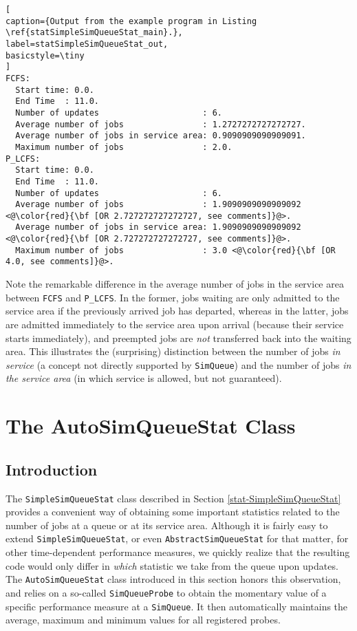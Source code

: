 \documentclass[12pt]{book}
\begin{document}
\begin{lstlisting}[
caption={Output from the example program in Listing \ref{statSimpleSimQueueStat_main}.},
label=statSimpleSimQueueStat_out,
basicstyle=\tiny
]
FCFS:
  Start time: 0.0.
  End Time  : 11.0.
  Number of updates                     : 6.
  Average number of jobs                : 1.2727272727272727.
  Average number of jobs in service area: 0.9090909090909091.
  Maximum number of jobs                : 2.0.
P_LCFS:
  Start time: 0.0.
  End Time  : 11.0.
  Number of updates                     : 6.
  Average number of jobs                : 1.9090909090909092 <@\color{red}{\bf [OR 2.727272727272727, see comments]}@>.
  Average number of jobs in service area: 1.9090909090909092 <@\color{red}{\bf [OR 2.727272727272727, see comments]}@>.
  Maximum number of jobs                : 3.0 <@\color{red}{\bf [OR 4.0, see comments]}@>.
\end{lstlisting}

Note the remarkable difference in the average number of jobs in the service area between
  \lstinline|FCFS| and \lstinline|P_LCFS|.
In the former, jobs waiting are only admitted to the service area if the previously arrived job
  has departed, whereas in the latter,
  jobs are admitted immediately to the service area upon arrival (because their service
  starts immediately), and preempted jobs are {\em not\/} transferred back into the waiting area.
This illustrates the (surprising) distinction between the number of jobs {\em in service\/}
  (a concept not directly supported by \lstinline|SimQueue|)
  and the number of jobs {\em in the service area\/}
  (in which service is allowed, but not guaranteed).

\section{The AutoSimQueueStat Class}
\label{stat-autosimqueuestat}

\subsection{Introduction}
\label{stat-autosimqueuestat-intro}

The \lstinline|SimpleSimQueueStat| class
  described in Section \ref{stat-SimpleSimQueueStat}
  provides a convenient way of obtaining some important
  statistics related to the number of jobs at a queue
  or at its service area.
Although it is fairly easy to extend \lstinline|SimpleSimQueueStat|,
  or even \lstinline|AbstractSimQueueStat| for that matter,
  for other time-dependent performance measures,
  we quickly realize that the resulting code would only differ
  in {\em which\/} statistic we take from the queue upon updates.
The \lstinline|AutoSimQueueStat| class introduced in this section
  honors this observation, and relies on a so-called
  \lstinline|SimQueueProbe| to obtain the momentary value of
  a specific performance measure at a \lstinline|SimQueue|.
It then automatically maintains the average, maximum and minimum
  values for all registered probes.
\end{document}
